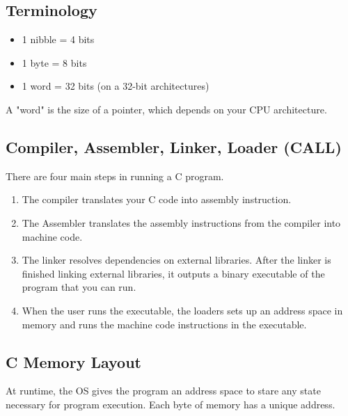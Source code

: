\documentclass{article}
\begin{document}
\subsection{Terminology}
\begin{itemize}
    \item 1 nibble = 4 bits
    \item 1 byte = 8 bits
    \item 1 word = 32 bits (on a 32-bit architectures)
\end{itemize}
A "word" is the size of a pointer, which depends on your CPU architecture.

\subsection{Compiler, Assembler, Linker, Loader (CALL)}
There are four main steps in running a C program.
\begin{enumerate}
    \item The compiler translates your C code into assembly instruction.
    \item The Assembler translates the assembly instructions from the compiler into machine code.
    \item The linker resolves dependencies on external libraries. After the linker is finished linking external libraries, it outputs a binary executable of the program that you can run.
    \item When the user runs the executable, the loaders sets up an address space in memory and runs the machine code instructions in the executable.
\end{enumerate}

\subsection{C Memory Layout}
At runtime, the OS gives the program an address space to stare any state necessary for program execution. Each byte of memory has a unique address.
\begin{center} %
\end{center}
\end{document}
